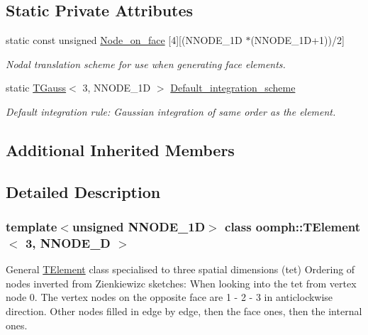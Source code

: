 \subsection*{Static Private Attributes}
\begin{DoxyCompactItemize}
\item 
static const unsigned \hyperlink{classoomph_1_1TElement_3_013_00_01NNODE__1D_01_4_a11d8a7cd61ba94009c98063233eee1e0}{Node\+\_\+on\+\_\+face} \mbox{[}4\mbox{]}\mbox{[}(N\+N\+O\+D\+E\+\_\+1D $\ast$(N\+N\+O\+D\+E\+\_\+1D+1))/2\mbox{]}
\begin{DoxyCompactList}\small\item\em Nodal translation scheme for use when generating face elements. \end{DoxyCompactList}\item 
static \hyperlink{classoomph_1_1TGauss}{T\+Gauss}$<$ 3, N\+N\+O\+D\+E\+\_\+1D $>$ \hyperlink{classoomph_1_1TElement_3_013_00_01NNODE__1D_01_4_a43ed593f28100efc4c1e2f69c812c980}{Default\+\_\+integration\+\_\+scheme}
\begin{DoxyCompactList}\small\item\em Default integration rule\+: Gaussian integration of same \textquotesingle{}order\textquotesingle{} as the element. \end{DoxyCompactList}\end{DoxyCompactItemize}
\subsection*{Additional Inherited Members}


\subsection{Detailed Description}
\subsubsection*{template$<$unsigned N\+N\+O\+D\+E\+\_\+1D$>$\newline
class oomph\+::\+T\+Element$<$ 3, N\+N\+O\+D\+E\+\_\+D $>$}

General \hyperlink{classoomph_1_1TElement}{T\+Element} class specialised to three spatial dimensions (tet) Ordering of nodes inverted from Zienkiewizc sketches\+: When looking into the tet from vertex node 0. The vertex nodes on the opposite face are 1 -\/ 2 -\/ 3 in anticlockwise direction. Other nodes filled in edge by edge, then the face ones, then the internal ones. 

